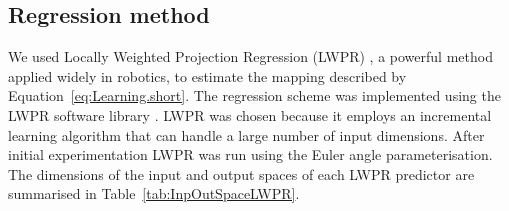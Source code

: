 \subsection{Regression method}\label{sec:Implementation.regression}

We used Locally Weighted Projection Regression (LWPR) \cite{vijayakumar_incremental_2005}, a powerful method applied widely in robotics, to estimate the mapping described by Equation~\eqref{eq:Learning.short}. The regression scheme was implemented using the LWPR software library \cite{klanke_library_2008}. LWPR was chosen because it employs an incremental learning algorithm that can handle a large number of input dimensions. After initial experimentation LWPR was run using the Euler angle parameterisation. 
%
The dimensions of the input and output spaces of each LWPR predictor are summarised in Table~\ref{tab:InpOutSpaceLWPR}.

